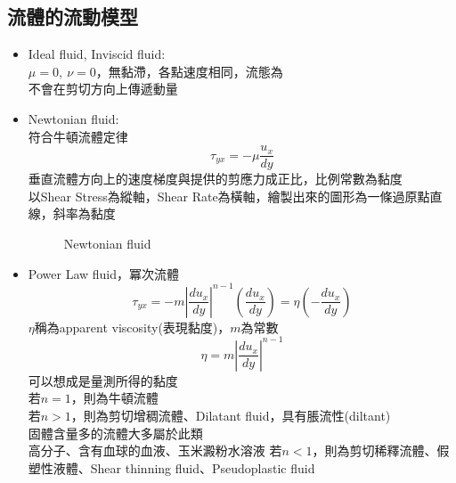 \documentclass[../main.tex]{subfiles}
\begin{document}
\subsection{流體的流動模型}
\begin{itemize}
  \item Ideal fluid, Inviscid fluid:\\
    $\mu=0,~\nu=0$，無黏滯，各點速度相同，流態為\\
    不會在剪切方向上傳遞動量
  \item Newtonian fluid:\\
    符合牛頓流體定律
    \begin{equation}
      \boxed{\tau_{yx} = -\mu \frac{u_x}{dy}}
    \end{equation}
    垂直流體方向上的速度梯度與提供的剪應力成正比，比例常數為黏度\\
    以Shear Stress為縱軸，Shear Rate為橫軸，繪製出來的圖形為一條過原點直線，斜率為黏度
    \begin{figure}[H]
      \centering
      \caption{Newtonian fluid}
      \label{fig:newtonian_fluid}
    \end{figure}
  \item Power Law fluid，冪次流體
    \begin{equation}
      \boxed{\tau_{yx} = -m\left|\frac{d u_x}{dy}\right|^{n-1}\left(\frac{du_x}{dy}\right) = \eta \left(-\frac{du_x}{dy}\right)}
    \end{equation}
    $\eta$稱為apparent viscosity(表現黏度)，$m$為常數
    \begin{equation}
      \eta = m\left|\frac{du_x}{dy}\right|^{n-1}
    \end{equation}
    可以想成是量測所得的黏度\\
    若$n=1$，則為牛頓流體\\
    若$n>1$，則為剪切增稠流體、Dilatant fluid，具有脹流性(diltant)\\
    固體含量多的流體大多屬於此類\\
    高分子、含有血球的血液、玉米澱粉水溶液
    若$n<1$，則為剪切稀釋流體、假塑性液體、Shear thinning fluid、Pseudoplastic fluid\\

\end{itemize}
\end{document}
